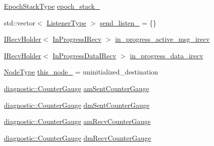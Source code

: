\begin{DoxyCompactItemize}
\item 
\hyperlink{structvt_1_1messaging_1_1_active_messenger_a746358029c37dabf2b4c8ad26642aee9}{Epoch\+Stack\+Type} \hyperlink{structvt_1_1messaging_1_1_active_messenger_a477f7599bd71cba2865e49f3610e6025}{epoch\+\_\+stack\+\_\+}
\item 
std\+::vector$<$ \hyperlink{structvt_1_1messaging_1_1_active_messenger_a63878fd4ef1fbc505bd1313d32049ca9}{Listener\+Type} $>$ \hyperlink{structvt_1_1messaging_1_1_active_messenger_a52779f8ed30e23442a802e42c3462a0b}{send\+\_\+listen\+\_\+} = \{\}
\item 
\hyperlink{structvt_1_1messaging_1_1_i_recv_holder}{I\+Recv\+Holder}$<$ \hyperlink{structvt_1_1messaging_1_1_in_progress_i_recv}{In\+Progress\+I\+Recv} $>$ \hyperlink{structvt_1_1messaging_1_1_active_messenger_aaa384d58565da05b8b3ac60c5ee68ee0}{in\+\_\+progress\+\_\+active\+\_\+msg\+\_\+irecv}
\item 
\hyperlink{structvt_1_1messaging_1_1_i_recv_holder}{I\+Recv\+Holder}$<$ \hyperlink{structvt_1_1messaging_1_1_in_progress_data_i_recv}{In\+Progress\+Data\+I\+Recv} $>$ \hyperlink{structvt_1_1messaging_1_1_active_messenger_aabf031983b435e4cf20d16dd561f179d}{in\+\_\+progress\+\_\+data\+\_\+irecv}
\item 
\hyperlink{namespacevt_a866da9d0efc19c0a1ce79e9e492f47e2}{Node\+Type} \hyperlink{structvt_1_1messaging_1_1_active_messenger_a44428f493f635833b6b8da6a6dfcf08f}{this\+\_\+node\+\_\+} = uninitialized\+\_\+destination
\item 
\hyperlink{namespacevt_1_1diagnostic_a95e27dc4e2a74cef48e2cf82a3c5cb36}{diagnostic\+::\+Counter\+Gauge} \hyperlink{structvt_1_1messaging_1_1_active_messenger_a8756789430c46b3829714999926a50ae}{am\+Sent\+Counter\+Gauge}
\item 
\hyperlink{namespacevt_1_1diagnostic_a95e27dc4e2a74cef48e2cf82a3c5cb36}{diagnostic\+::\+Counter\+Gauge} \hyperlink{structvt_1_1messaging_1_1_active_messenger_a96a3d12f2dcad41e66f7ee766d1e8d5f}{dm\+Sent\+Counter\+Gauge}
\item 
\hyperlink{namespacevt_1_1diagnostic_a95e27dc4e2a74cef48e2cf82a3c5cb36}{diagnostic\+::\+Counter\+Gauge} \hyperlink{structvt_1_1messaging_1_1_active_messenger_aee8bc2dca92bc3be57472aca90e45759}{am\+Recv\+Counter\+Gauge}
\item 
\hyperlink{namespacevt_1_1diagnostic_a95e27dc4e2a74cef48e2cf82a3c5cb36}{diagnostic\+::\+Counter\+Gauge} \hyperlink{structvt_1_1messaging_1_1_active_messenger_a910d9d24eea2daf233a063fd1348ec31}{dm\+Recv\+Counter\+Gauge}
\item 

\end{DoxyCompactItemize}
